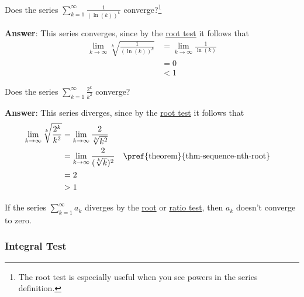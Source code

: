\begin{exm}\label{exm-positive-series:7}
	Does the series $\sum_{k=1}^\infty \frac{1}{(\ln(k))^k}$ converge?\footnote{The root
		test is especially useful when you see powers in the series definition.}
	\begin{flushleft}
		\textbf{Answer}: This series converges, since by the \hyperref[thm-root-test-series]{root test}
		it follows that
		\begin{align*}
			\lim_{k\to\infty} \sqrt[k]{\frac{1}{(\ln(k))^k}}
			 & = \lim_{k\to\infty} \frac{1}{\ln(k)} \\
			 & = 0                                  \\
			 & < 1
		\end{align*}
	\end{flushleft}
\end{exm}

\begin{exm}\label{exm-positive-series:8}
	Does the series $\sum_{k=1}^\infty \frac{2^k}{k^2}$ converge?
	\begin{flushleft}
		\textbf{Answer}: This series diverges, since by the \hyperref[thm-root-test-series]{root test}
		it follows that
		\begin{align*}
			\lim_{k\to\infty} \sqrt[k]{\frac{2^k}{k^2}}
			 & = \lim_{k\to\infty} \frac{2}{\sqrt[k]{k^2}}                                                     \\
			 & = \lim_{k\to\infty} \frac{2}{(\sqrt[k]{k})^2} &  & \text{\pref{theorem}{thm-sequence-nth-root}} \\
			 & = 2                                                                                             \\
			 & > 1
		\end{align*}
	\end{flushleft}
\end{exm}

\begin{rem}\label{rem-root-ratio-test}
	If the series $\sum_{k=1}^\infty a_k$ diverges by the \hyperref[thm-root-test-series]{root}
	or \hyperref[thm-ratio-test-series]{ratio test}, then $a_k$ doesn't converge to zero.
\end{rem}

\subsubsection{Integral Test}\label{subsubsec-integral-test-series}

